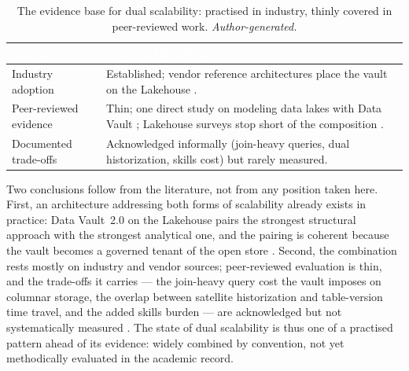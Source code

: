 \begin{table}[H]
\centering
\renewcommand{\arraystretch}{1.3}
\caption{The evidence base for dual scalability: practised in industry, thinly covered in peer-reviewed work. \textit{Author-generated.}}
\label{tab:ch3-evidence}
\begin{tabularx}{\linewidth}{|>{\raggedright\arraybackslash}p{4.2cm}|>{\raggedright\arraybackslash}X|}
\hline
\rowcolor{tblheader}
\textcolor{white}{\textbf{Aspect}} &
\textcolor{white}{\textbf{State in the literature}} \\
\hline
Industry adoption & Established; vendor reference architectures place the vault on the Lakehouse \parencite{databricks2022, moermans2023, moronta2026}. \\
Peer-reviewed evidence & Thin; one direct study on modeling data lakes with Data Vault \parencite{giebler2019dv}; Lakehouse surveys stop short of the composition \parencite{schneider2024, harby2024}. \\
Documented trade-offs & Acknowledged informally (join-heavy queries, dual historization, skills cost) but rarely measured. \\
\hline
\end{tabularx}
\end{table}

Two conclusions follow from the literature, not from any position taken here. First, an architecture addressing both forms of scalability already exists in practice: Data Vault~2.0 on the Lakehouse pairs the strongest structural approach with the strongest analytical one, and the pairing is coherent because the vault becomes a governed tenant of the open store \parencite{databricks2022, giebler2019dv}. Second, the combination rests mostly on industry and vendor sources; peer-reviewed evaluation is thin, and the trade-offs it carries --- the join-heavy query cost the vault imposes on columnar storage, the overlap between satellite historization and table-version time travel, and the added skills burden --- are acknowledged but not systematically measured \parencite{schneider2024, harby2024}. The state of dual scalability is thus one of a practised pattern ahead of its evidence: widely combined by convention, not yet methodically evaluated in the academic record.
